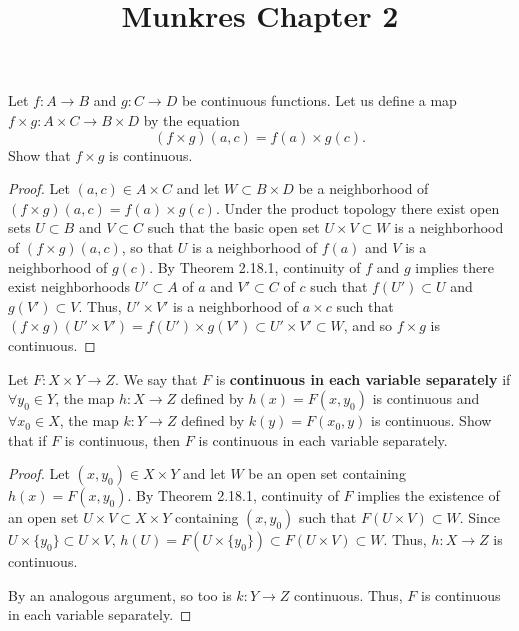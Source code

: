 \documentclass[a4paper,10pt]{article}
\title{Munkres Chapter 2}
\author{}
\begin{document}
\maketitle

\begin{exercise}[ID=2.18.10]
    Let $f: A \rightarrow B$ and $g: C \rightarrow D$ be continuous functions.
    Let us define a map $f \times g: A \times C \rightarrow B \times D$ by the equation
    $$ (f \times g)(a, c) = f(a) \times g(c).$$
    Show that $f \times g$ is continuous.
\end{exercise}

\begin{solution}
    \begin{proof}
        Let $(a, c) \in A \times C$ and let $W \subset B \times D$ be a neighborhood of $(f \times g)(a, c) = f(a) \times g(c)$.
        Under the product topology there exist open sets $U \subset B$ and $V \subset C$ such that the basic open set $U \times V \subset W$ is a neighborhood of $(f \times g)(a, c)$, so that $U$ is a neighborhood of $f(a)$ and $V$ is a neighborhood of $g(c)$.
        By Theorem 2.18.1, continuity of $f$ and $g$ implies there exist neighborhoods $U' \subset A$ of $a$ and $V' \subset C$ of $c$ such that $f(U') \subset U$ and $g(V') \subset V$.
        Thus, $U' \times V'$ is a neighborhood of $a \times c$ such that $(f \times g)(U' \times V') = f(U') \times g(V') \subset U' \times V' \subset W$, and so $f \times g$ is continuous.
    \end{proof}
\end{solution}
\newpage

\begin{exercise}[ID=2.18.11]
    Let $F: X \times Y \rightarrow Z$. We say that $F$ is {\bf continuous in each variable separately} if $\forall y_0 \in Y$, the map $h: X \rightarrow Z$ defined by $h(x) = F(x, y_0)$ is continuous and $\forall x_0 \in X$, the map $k: Y \rightarrow Z$ defined by $k(y) = F(x_0, y)$ is continuous.
    Show that if $F$ is continuous, then $F$ is continuous in each variable separately.
\end{exercise}

\begin{solution}
    \begin{proof}
        Let $(x, y_0) \in X \times Y$ and let $W$ be an open set containing $h(x) = F(x, y_0)$.
        By Theorem 2.18.1, continuity of $F$ implies the existence of an open set $U \times V \subset X \times Y$ containing $(x, y_0)$ such that $F(U \times V) \subset W$.
        Since $U \times \{y_0\} \subset U \times V$, $h(U) = F(U \times \{y_0\}) \subset F(U \times V) \subset W$.
        Thus, $h: X \rightarrow Z$ is continuous.

        By an analogous argument, so too is $k: Y \rightarrow Z$ continuous.
        Thus, $F$ is continuous in each variable separately.
    \end{proof}
\end{solution}
\newpage
\end{document}
